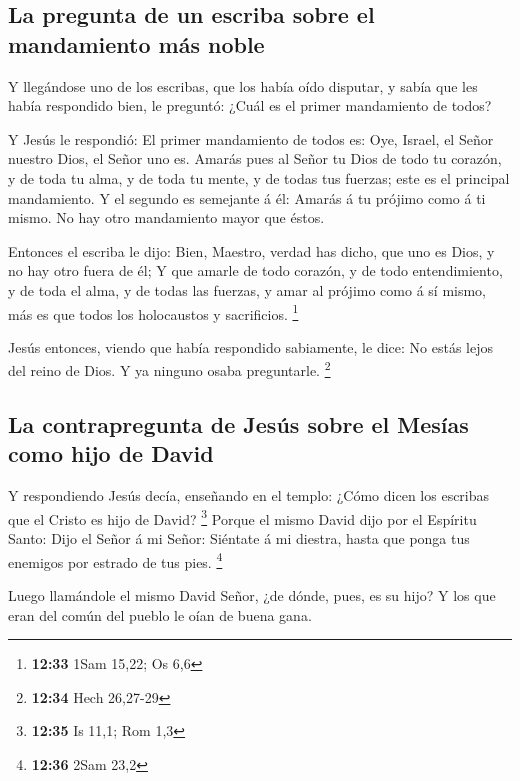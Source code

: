 \hypertarget{la-pregunta-de-un-escriba-sobre-el-mandamiento-muxe1s-noble}{%
\subsection{La pregunta de un escriba sobre el mandamiento más
noble}\label{la-pregunta-de-un-escriba-sobre-el-mandamiento-muxe1s-noble}}

 Y llegándose uno de los escribas, que los había oído
disputar, y sabía que les había respondido bien, le preguntó: ¿Cuál es
el primer mandamiento de todos?

 Y Jesús le respondió: El primer mandamiento de todos es:
Oye, Israel, el Señor nuestro Dios, el Señor uno es. 
Amarás pues al Señor tu Dios de todo tu corazón, y de toda tu alma, y de
toda tu mente, y de todas tus fuerzas; este es el principal mandamiento.
 Y el segundo es semejante á él: Amarás á tu prójimo como
á ti mismo. No hay otro mandamiento mayor que éstos.

 Entonces el escriba le dijo: Bien, Maestro, verdad has
dicho, que uno es Dios, y no hay otro fuera de él;  Y que
amarle de todo corazón, y de todo entendimiento, y de toda el alma, y de
todas las fuerzas, y amar al prójimo como á sí mismo, más es que todos
los holocaustos y sacrificios. \footnote{\textbf{12:33} 1Sam 15,22; Os
  6,6}

 Jesús entonces, viendo que había respondido sabiamente,
le dice: No estás lejos del reino de Dios. Y ya ninguno osaba
preguntarle. \footnote{\textbf{12:34} Hech 26,27-29}

\hypertarget{la-contrapregunta-de-jesuxfas-sobre-el-mesuxedas-como-hijo-de-david}{%
\subsection{La contrapregunta de Jesús sobre el Mesías como hijo de
David}\label{la-contrapregunta-de-jesuxfas-sobre-el-mesuxedas-como-hijo-de-david}}

 Y respondiendo Jesús decía, enseñando en el templo:
¿Cómo dicen los escribas que el Cristo es hijo de David? \footnote{\textbf{12:35}
  Is 11,1; Rom 1,3}  Porque el mismo David dijo por el
Espíritu Santo: Dijo el Señor á mi Señor: Siéntate á mi diestra, hasta
que ponga tus enemigos por estrado de tus pies. \footnote{\textbf{12:36}
  2Sam 23,2}

 Luego llamándole el mismo David Señor, ¿de dónde, pues,
es su hijo? Y los que eran del común del pueblo le oían de buena gana.

